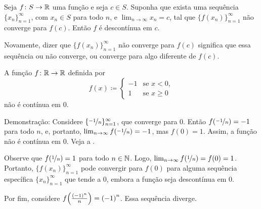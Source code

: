 \begin{prop}
Seja $f \colon S \to {\mathbb{R}}$ uma função e seja $c \in S$. Suponha
que exista uma sequência $\{ x_n \}_{n=1}^\infty$, com $x_n \in S$ para todo $n$,
e $\lim_{n\to\infty} x_n = c$,
tal que $\bigl\{ f(x_n) \bigr\}_{n=1}^\infty$
não converge para $f(c)$.
Então $f$ é descontínua em $c$.
\end{prop}

Novamente,
dizer que
$\bigl\{ f(x_n) \bigr\}_{n=1}^\infty$ não converge para $f(c)$
significa que essa sequência
ou não converge,
ou converge para algo diferente de $f(c)$.

\begin{example} \label{example:jumpdiscont}
A função $f \colon {\mathbb{R}} \to {\mathbb{R}}$ definida por
\begin{equation*}
f(x) \coloneqq 
\begin{cases}
-1 & \text{se } x < 0, \\
1 & \text{se } x \geq 0
\end{cases}
\end{equation*}
não é contínua em 0.

Demonstração: Considere $\{ \nicefrac{-1}{n} \}_{n=1}^\infty$, que converge para 0. Então
$f(\nicefrac{-1}{n}) = -1$ para todo $n$,
e, portanto,
$\lim_{n\to\infty} f(\nicefrac{-1}{n}) = -1$, mas $f(0) = 1$. Assim, a função
não é contínua em 0. Veja a
.

\begin{myfigureht}
\caption{Descontinuidade de salto. Os valores de
$f(\nicefrac{-1}{n})$ e $f(0)$ estão marcados como pontos pretos.\label{fig:jumpdiscont}}
\end{myfigureht}

Observe que $f(\nicefrac{1}{n}) = 1$ para todo $n \in {\mathbb{N}}$.
Logo, $\lim_{n\to\infty} f(\nicefrac{1}{n}) = f(0) = 1$. Portanto,
$\bigl\{ f(x_n) \bigr\}_{n=1}^\infty$ pode convergir para $f(0)$
para alguma sequência específica
$\{ x_n \}_{n=1}^\infty$ que tende a 0,
embora a função seja descontínua em 0.

Por fim, considere $f\Bigl(\frac{{(-1)}^n}{n}\Bigr) = {(-1)}^n$.
Essa sequência diverge.
\end{example}

